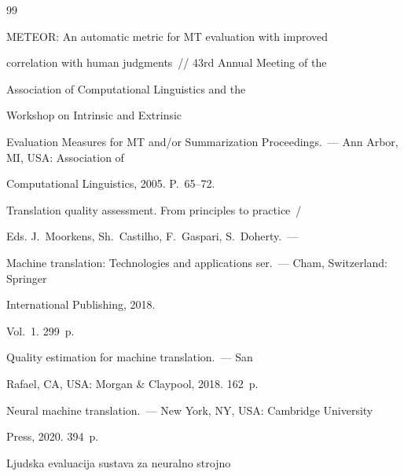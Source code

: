 {\small\frenchspacing


{ %




\begin{thebibliography}{99}







 METEOR: An automatic metric for MT evaluation with improved 


correlation with human judgments~/\!\!/ 43rd Annual Meeting of the 


Association of Computational Linguistics and the


Workshop on Intrinsic and Extrinsic 


Evaluation Measures for MT and\!/\!or Summarization   Proceedings.~--- Ann Arbor, MI, USA: Association of 


Computational Linguistics, 2005. P.~65--72.










Translation quality assessment. From principles to practice~/


Eds. J.~Moorkens, Sh.~Castilho, F.~Gaspari, S.~Doherty.~--- 


Machine translation: Technologies and applications ser.~--- Cham, Switzerland: Springer


International Publishing, 2018. 


Vol.~1. 299~p. 




 Quality estimation for machine translation.~--- San 


Rafael, CA, USA: Morgan \& Claypool, 2018. 162~p.







 Neural machine translation.~--- New York, NY, USA: Cambridge University 


Press, 2020. 394~p.







 Ljudska evaluacija sustava za neuralno strojno 



\end{thebibliography}}}

